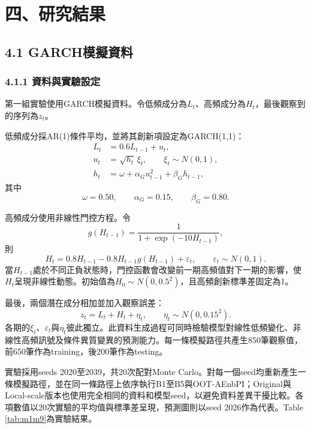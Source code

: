 \chapter*{四、研究結果}

\section*{4.1 GARCH模擬資料}

\subsection*{4.1.1 資料與實驗設定}

第一組實驗使用GARCH模擬資料。令低頻成分為$L_t$、高頻成分為$H_t$，最後觀察到的序列為$z_t$。

低頻成分採AR(1)條件平均，並將其創新項設定為GARCH(1,1)：
\begin{align}
 L_t &=0.6L_{t-1}+u_t,\\
 u_t &=\sqrt{h_t}\,\xi_t,\qquad \xi_t\sim N(0,1),\\
 h_t &=\omega+\alpha_Gu_{t-1}^{2}+\beta_Gh_{t-1},
\end{align}
其中
\begin{equation}
 \omega=0.50,\qquad \alpha_G=0.15,\qquad \beta_G=0.80.
\end{equation}

高頻成分使用非線性門控方程。令
\begin{equation}
 g(H_{t-1})=\frac{1}{1+\exp(-10H_{t-1})},
\end{equation}
則
\begin{equation}
 H_t=0.8H_{t-1}-0.8H_{t-1}g(H_{t-1})+\varepsilon_t,
 \qquad \varepsilon_t\sim N(0,1).
\end{equation}
當$H_{t-1}$處於不同正負狀態時，門控函數會改變前一期高頻值對下一期的影響，使$H_t$呈現非線性動態。初始值為$H_0\sim N(0,0.5^2)$，且高頻創新標準差固定為1。

最後，兩個潛在成分相加並加入觀察誤差：
\begin{equation}
 z_t=L_t+H_t+\eta_t,
 \qquad \eta_t\sim N(0,0.15^2).
\end{equation}
各期的$\xi_t$、$\varepsilon_t$與$\eta_t$彼此獨立。此資料生成過程可同時檢驗模型對線性低頻變化、非線性高頻訊號及條件異質變異的預測能力。每一條模擬路徑共產生850筆觀察值，前650筆作為training，後200筆作為testing。

實驗採用seeds 2020至2039，共20次配對Monte Carlo。對每一個seed均重新產生一條模擬路徑，並在同一條路徑上依序執行B1至B5與OOT-AEnbPI；Original與Local-scale版本也使用完全相同的資料和模型seed，以避免資料差異干擾比較。各項數值以20次實驗的平均值與標準差呈現，預測圖則以seed 2026作為代表。Table \ref{tab:m1m9}為實驗結果。

